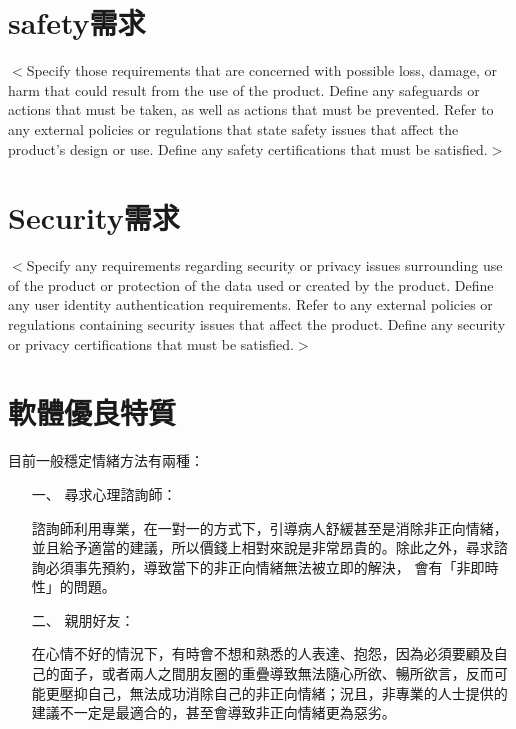 \documentclass[12pt]{scrreprt}
\begin{document}
\section{safety需求}
$<$Specify those requirements that are concerned with possible loss, damage, or 
harm that could result from the use of the product. Define any safeguards or 
actions that must be taken, as well as actions that must be prevented. Refer to 
any external policies or regulations that state safety issues that affect the 
product’s design or use. Define any safety certifications that must be 
satisfied.$>$

\section{Security需求}
$<$Specify any requirements regarding security or privacy issues surrounding use 
of the product or protection of the data used or created by the product. Define 
any user identity authentication requirements. Refer to any external policies or 
regulations containing security issues that affect the product. Define any 
security or privacy certifications that must be satisfied.$>$

\section{軟體優良特質}
目前一般穩定情緒方法有兩種：

\begin{itemize}
\item[一、]{尋求心理諮詢師：}

諮詢師利用專業，在一對一的方式下，引導病人舒緩甚至是消除非正向情緒，並且給予適當的建議，所以價錢上相對來說是非常昂貴的。除此之外，尋求諮詢必須事先預約，導致當下的非正向情緒無法被立即的解決， 會有「非即時性」的問題。

\item[二、]{親朋好友：}

在心情不好的情況下，有時會不想和熟悉的人表達、抱怨，因為必須要顧及自己的面子，或者兩人之間朋友圈的重疊導致無法隨心所欲、暢所欲言，反而可能更壓抑自己，無法成功消除自己的非正向情緒；況且，非專業的人士提供的建議不一定是最適合的，甚至會導致非正向情緒更為惡劣。

\end{itemize}
\end{document}
